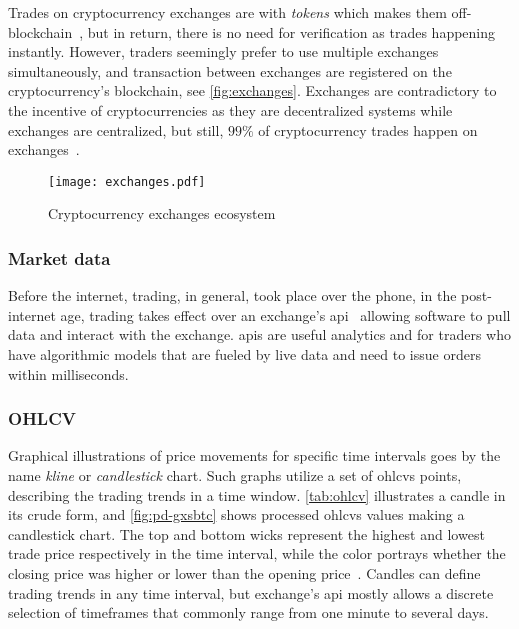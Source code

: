 Trades on cryptocurrency exchanges are with \emph{tokens} which makes them off-blockchain~\cite{exchange_off_chain}, but in return, there is no need for verification as trades happening instantly. However, traders seemingly prefer to use multiple exchanges simultaneously, and transaction between exchanges are registered on the cryptocurrency's blockchain, see \autoref{fig:exchanges}. Exchanges are contradictory to the incentive of cryptocurrencies as they are decentralized systems while exchanges are centralized, but still, $99\%$ of cryptocurrency trades happen on exchanges~\cite{coinsutra}.

\begin{figure}[ht]
    \centering
    \texttt{[image: exchanges.pdf]}
    \caption{Cryptocurrency exchanges ecosystem}
\label{fig:exchanges}
\end{figure}

\subsubsection{Market data}
Before the internet, trading, in general, took place over the phone, in the post-internet age, trading takes effect over an exchange's \ac{api}~\cite{exchange_api} allowing software to pull data and interact with the exchange. \acp{api} are useful analytics and for traders who have algorithmic models that are fueled by live data and need to issue orders within milliseconds.

\subsubsection{OHLCV}
Graphical illustrations of price movements for specific time intervals goes by the name \emph{kline} or \emph{candlestick} chart. Such graphs utilize a set of \acp{ohlcv} points, describing the trading trends in a time window. \autoref{tab:ohlcv} illustrates a candle in its crude form, and \autoref{fig:pd-gxsbtc} shows processed \acp{ohlcv} values making a candlestick chart. The top and bottom wicks represent the highest and lowest trade price respectively in the time interval, while the color portrays whether the closing price was higher or lower than the opening price~\cite{P&D_to_the_moon}. Candles can define trading trends in any time interval, but exchange’s \ac{api} mostly allows a discrete selection of timeframes that commonly range from one minute to several days.


